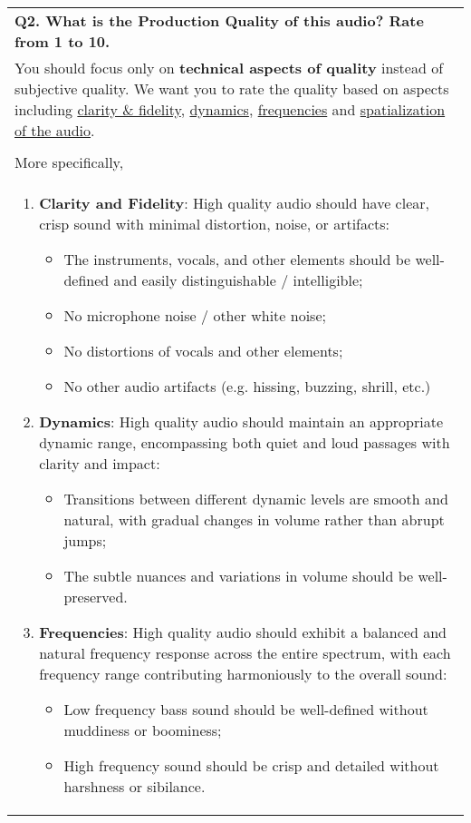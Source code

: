 \begin{table*}[ht]
\begin{tabular}{p{15cm}}
\textbf{Q2. What is the Production Quality of this audio? Rate from 1 to 10.} \\
You should focus only on \textbf{technical aspects of quality} instead of subjective quality. We want you to rate the quality based on aspects including \underline{clarity \& fidelity}, \underline{dynamics}, \underline{frequencies} and \underline{spatialization of the audio}.\\
\\
More specifically,\\
\begin{enumerate}[leftmargin=.75cm]
    \item \textbf{Clarity and Fidelity}: High quality audio should have clear, crisp sound with minimal distortion, noise, or artifacts:
    \begin{itemize}
        \item The instruments, vocals, and other elements should be well-defined and easily distinguishable / intelligible;
        \item No microphone noise / other white noise;
        \item No distortions of vocals and other elements;
        \item No other audio artifacts (e.g. hissing, buzzing, shrill, etc.)
    \end{itemize}
    \item \textbf{Dynamics}: High quality audio should maintain an appropriate dynamic range, encompassing both quiet and loud passages with clarity and impact:
    \begin{itemize}
        \item Transitions between different dynamic levels are smooth and natural, with gradual changes in volume rather than abrupt jumps;
        \item The subtle nuances and variations in volume should be well-preserved.
    \end{itemize}
    \item \textbf{Frequencies}: High quality audio should exhibit a balanced and natural frequency response across the entire spectrum, with each frequency range contributing harmoniously to the overall sound:
    \begin{itemize}
        \item Low frequency bass sound should be well-defined without muddiness or boominess;
        \item High frequency sound should be crisp and detailed without harshness or sibilance.
    \end{itemize}

\end{enumerate}
\end{tabular}
\end{table*}
